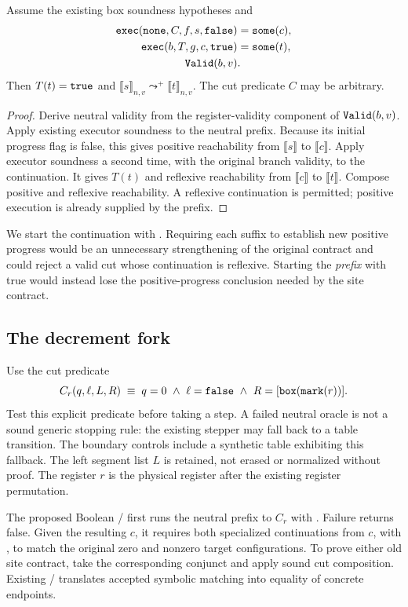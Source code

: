 \begin{proposition}
Assume the existing box soundness hypotheses and
\[
\begin{aligned}
\code{exec}(\code{none},C,f,s,\code{false})&=\code{some}(c),\\
\code{exec}(b,T,g,c,\code{true})&=\code{some}(t),\\
\code{Valid}(b,v)&.
\end{aligned}
\]
Then $T(t)=\code{true}$ and
$\llbracket s\rrbracket_{n,v}\leadsto^+\llbracket t\rrbracket_{n,v}$.
The cut predicate $C$ may be arbitrary.
\end{proposition}
\begin{proof}
Derive neutral validity from the register-validity component of $\code{Valid}(b,v)$. Apply existing executor soundness to the neutral prefix. Because its initial progress flag is false, this gives positive reachability from $\llbracket s\rrbracket$ to $\llbracket c\rrbracket$. Apply executor soundness a second time, with the original branch validity, to the continuation. It gives $T(t)$ and reflexive reachability from $\llbracket c\rrbracket$ to $\llbracket t\rrbracket$. Compose positive and reflexive reachability. A reflexive continuation is permitted; positive execution is already supplied by the prefix.
\end{proof}

We start the continuation with . Requiring each suffix to establish new positive progress would be an unnecessary strengthening of the original contract and could reject a valid cut whose continuation is reflexive. Starting the \emph{prefix} with true would instead lose the positive-progress conclusion needed by the site contract.

\subsection{The decrement fork}
Use the cut predicate
\[
 C_r(q,\ell,L,R)\;\equiv\;
 q=0\ \wedge\ \ell=\code{false}\ \wedge\
 R=[\code{box}(\code{mark}(r))].
\]
Test this explicit predicate before taking a step. A failed neutral oracle is not a sound generic stopping rule: the existing stepper may fall back to a table transition. The boundary controls include a synthetic table exhibiting this fallback. The left segment list $L$ is retained, not erased or normalized without proof. The register $r$ is the physical register after the existing register permutation.

The proposed Boolean  /  first runs the neutral prefix to $C_r$ with . Failure returns false. Given the resulting $c$, it requires both specialized continuations from $c$, with , to match the original zero and nonzero target configurations. To prove either old site contract, take the corresponding conjunct and apply sound cut composition. Existing  /  translates accepted symbolic matching into equality of concrete endpoints.

